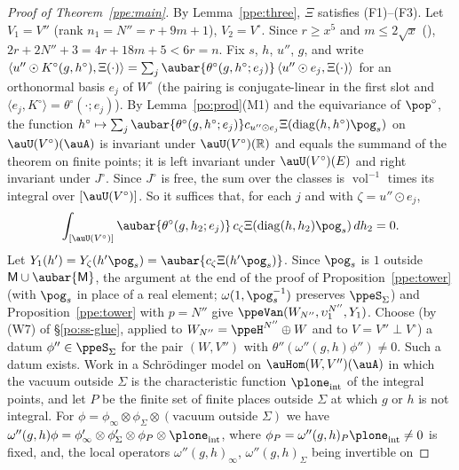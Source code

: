 \documentclass[10pt]{amsart}
\theoremstyle{definition}
\theoremstyle{remark}
\newcommand{\R}{\mathbb R}
\begin{document}
\begin{proof}[Proof of Theorem~\ref{ppe:main}]
By Lemma~\ref{ppe:three}, $\Xi$ satisfies (F1)--(F3). Let $V_1=V''$ (rank $n_1=N''=r+9m+1$),
$V_2=V^\circ$. Since $r\ge x^5$ and $m\le2\sqrt x$ ({\cite[Lemma~13.4]{P46}}),
$2r+2N''+3=4r+18m+5<6r=n$. Fix $s$, $h$, $u''$, $g$, and write
$\langle u''\odot K^\circ(g,h^\circ),\Xi(\cdot)\rangle=\sum_j\aubar{\theta^\circ(g,h^\circ;e_j)}\,
\langle u''\odot e_j,\Xi(\cdot)\rangle$ for an orthonormal basis $e_j$ of $W^\circ$ (the pairing is
conjugate-linear in the first slot and $\langle e_j,K^\circ\rangle=\theta^\circ(\cdot;e_j)$). By
Lemma~\ref{po:prod}(M1) and the equivariance of $\pop^\circ$, the function
$h^\circ\mapsto\sum_j\aubar{\theta^\circ(g,h^\circ;e_j)}c_{u''\odot e_j}\Xi(\operatorname{diag}(h,
h^\circ)\pog_s)$ on $\auU(V^\circ)(\auA)$ is invariant under $\auU(V^\circ)(\R)$ and equals the
summand of the theorem on finite points; it is left invariant under $\auU(V^\circ)(E)$ and right
invariant under $J^\circ$. Since $J^\circ$ is free, the sum over the classes is
$\operatorname{vol}^{-1}$ times its integral over $[\auU(V^\circ)]$. So it suffices that, for each
$j$ and with $\zeta=u''\odot e_j$,
\begin{equation}\label{ppe:eq-goal}
\int_{[\auU(V^\circ)]}\aubar{\theta^\circ(g,h_2;e_j)}\,c_\zeta\Xi(\operatorname{diag}(h,h_2)\pog_s)\,
dh_2=0 .
\end{equation}
Let $Y_1(h')=Y_\zeta(h'\pog_s)=\aubar{c_\zeta\Xi(h'\pog_s)}$. Since $\pog_s$ is $1$ outside
$\mathsf M\cup\aubar{\mathsf M}$, the argument at the end of the proof of
Proposition~\ref{ppe:tower} (with $\pog_s$ in place of a real element; $\omega(1,\pog_s^{-1})$
preserves $\ppeS_\Sigma$) and Proposition~\ref{ppe:tower} with $p=N''$ give
$\ppeVan(W_{N''},\upsilon_1^{N''},Y_1)$. Choose (by (W7) of \S\ref{po:ss-glue}, applied to
$W_{N''}=\ppeH^{N''}\oplus W$ and to $V=V''\perp V^\circ$) a datum $\phi''\in\ppeS_\Sigma$ for the
pair $(W,V'')$ with $\theta''(\omega''(g,h)\phi'')\ne0$. Such a datum exists. Work in a Schr\"odinger model
on $\auHom(W,V'')(\auA)$ in which the vacuum outside $\Sigma$ is the characteristic function
$\plone_{\mathrm{int}}$ of the integral points, and let $P$ be the finite set of finite places
outside $\Sigma$ at which $g$ or $h$ is not integral. For $\phi=\phi_\infty\otimes\phi_\Sigma\otimes
(\text{vacuum outside }\Sigma)$ we have $\omega''(g,h)\phi=\phi'_\infty\otimes\phi'_\Sigma\otimes
\phi_P\otimes\plone_{\mathrm{int}}$, where $\phi_P=\omega''(g,h)_P\plone_{\mathrm{int}}\ne0$ is
fixed, and, the local operators $\omega''(g,h)_\infty$, $\omega''(g,h)_\Sigma$ being invertible on

\end{proof}
\end{document}
